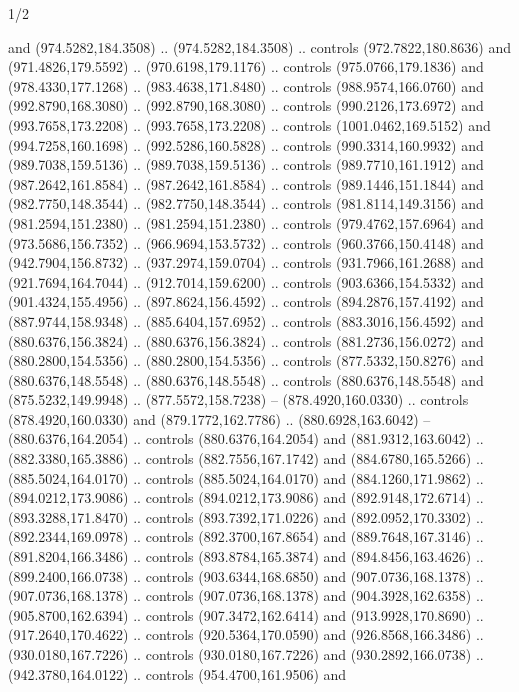 \begin{flagdescription}{1/2}
\begin{scope}[xshift=0.75\flaglength,yshift=0.5\flagwidth,scale=0.00293\flagwidth]
\begin{scope}[scale=0.675,y=0.80pt, x=0.80pt,yscale=-1,xshift=-720,yshift=-240]
\begin{scope}[miter limit=4.80]
\begin{scope}[miter limit=3.00]
  and (974.5282,184.3508) .. (974.5282,184.3508) .. controls (972.7822,180.8636)
  and (971.4826,179.5592) .. (970.6198,179.1176) .. controls (975.0766,179.1836)
  and (978.4330,177.1268) .. (983.4638,171.8480) .. controls (988.9574,166.0760)
  and (992.8790,168.3080) .. (992.8790,168.3080) .. controls (990.2126,173.6972)
  and (993.7658,173.2208) .. (993.7658,173.2208) .. controls
  (1001.0462,169.5152) and (994.7258,160.1698) .. (992.5286,160.5828) ..
  controls (990.3314,160.9932) and (989.7038,159.5136) .. (989.7038,159.5136) ..
  controls (989.7710,161.1912) and (987.2642,161.8584) .. (987.2642,161.8584) ..
  controls (989.1446,151.1844) and (982.7750,148.3544) .. (982.7750,148.3544) ..
  controls (981.8114,149.3156) and (981.2594,151.2380) .. (981.2594,151.2380) ..
  controls (979.4762,157.6964) and (973.5686,156.7352) .. (966.9694,153.5732) ..
  controls (960.3766,150.4148) and (942.7904,156.8732) .. (937.2974,159.0704) ..
  controls (931.7966,161.2688) and (921.7694,164.7044) .. (912.7014,159.6200) ..
  controls (903.6366,154.5332) and (901.4324,155.4956) .. (897.8624,156.4592) ..
  controls (894.2876,157.4192) and (887.9744,158.9348) .. (885.6404,157.6952) ..
  controls (883.3016,156.4592) and (880.6376,156.3824) .. (880.6376,156.3824) ..
  controls (881.2736,156.0272) and (880.2800,154.5356) .. (880.2800,154.5356) ..
  controls (877.5332,150.8276) and (880.6376,148.5548) .. (880.6376,148.5548) ..
  controls (880.6376,148.5548) and (875.5232,149.9948) .. (877.5572,158.7238) --
  (878.4920,160.0330) .. controls (878.4920,160.0330) and (879.1772,162.7786) ..
  (880.6928,163.6042) -- (880.6376,164.2054) .. controls (880.6376,164.2054) and
  (881.9312,163.6042) .. (882.3380,165.3886) .. controls (882.7556,167.1742) and
  (884.6780,165.5266) .. (885.5024,164.0170) .. controls (885.5024,164.0170) and
  (884.1260,171.9862) .. (894.0212,173.9086) .. controls (894.0212,173.9086) and
  (892.9148,172.6714) .. (893.3288,171.8470) .. controls (893.7392,171.0226) and
  (892.0952,170.3302) .. (892.2344,169.0978) .. controls (892.3700,167.8654) and
  (889.7648,167.3146) .. (891.8204,166.3486) .. controls (893.8784,165.3874) and
  (894.8456,163.4626) .. (899.2400,166.0738) .. controls (903.6344,168.6850) and
  (907.0736,168.1378) .. (907.0736,168.1378) .. controls (907.0736,168.1378) and
  (904.3928,162.6358) .. (905.8700,162.6394) .. controls (907.3472,162.6414) and
  (913.9928,170.8690) .. (917.2640,170.4622) .. controls (920.5364,170.0590) and
  (926.8568,166.3486) .. (930.0180,167.7226) .. controls (930.0180,167.7226) and
  (930.2892,166.0738) .. (942.3780,164.0122) .. controls (954.4700,161.9506) and

\end{scope}
\end{scope}
\end{scope}
\end{scope}
\end{flagdescription}
